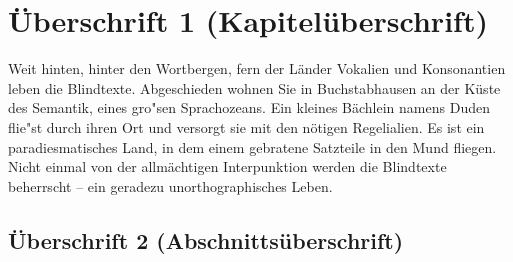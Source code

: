 \documentclass[11pt, rgb]{scrreprt}
\begin{document}
\listoftables
{}




%
%
%
%



\normalsize

\chapter{Überschrift 1 (Kapitelüberschrift)}

Weit hinten, hinter den Wortbergen, fern der Länder Vokalien und Konsonantien leben die Blindtexte. Abgeschieden wohnen Sie in Buchstabhausen an der Küste des Semantik, eines gro"sen Sprachozeans. Ein kleines Bächlein namens Duden flie"st durch ihren Ort und versorgt sie mit den nötigen Regelialien. Es ist ein paradiesmatisches Land, in dem einem gebratene Satzteile in den Mund fliegen. Nicht einmal von der allmächtigen Interpunktion werden die Blindtexte beherrscht – ein geradezu unorthographisches Leben.

\section{Überschrift 2 (Abschnittsüberschrift)}
\end{document}
